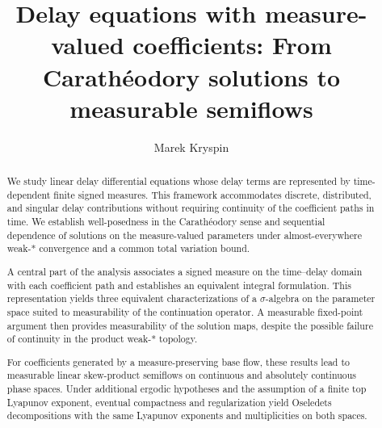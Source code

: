 \documentclass[reqno]{amsart}
\theoremstyle{plain}
\numberwithin{equation}{section}
\numberwithin{definition}{section}
\begin{document}
\title[Delay equations with measure-valued coefficients]{ Delay equations with measure-valued coefficients:
From Carath\'eodory solutions to measurable semiflows }
\author[M.~Kryspin]{Marek Kryspin}
\address[Marek Kryspin]{Faculty of Pure and Applied Mathematics,
Wroc{\l}aw University of Science and Technology,
Wybrze\.ze Wyspia\'nskiego 27, PL-50-370 Wroc{\l}aw, Poland.}
\begin{abstract}
 We study linear delay differential equations whose delay
terms are represented by time-dependent finite signed
measures. This framework accommodates discrete,
distributed, and singular delay contributions without
requiring continuity of the coefficient paths in time.
We establish well-posedness in the Carath\'eodory sense
and sequential dependence of solutions on the
measure-valued parameters under almost-everywhere
weak-* convergence and a common total variation bound.

A central part of the analysis associates a signed
measure on the time--delay domain with each coefficient
path and establishes an equivalent integral formulation.
This representation yields three equivalent
characterizations of a $\sigma$-algebra on the parameter
space suited to measurability of the continuation
operator. A measurable fixed-point argument then
provides measurability of the solution maps, despite
the possible failure of continuity in the product
weak-* topology.

For coefficients generated by a measure-preserving
base flow, these results lead to measurable linear
skew-product semiflows on continuous and absolutely
continuous phase spaces. Under additional ergodic
hypotheses and the assumption of a finite top
Lyapunov exponent, eventual compactness and
regularization yield Oseledets decompositions with
the same Lyapunov exponents and multiplicities
on both spaces.
\end{abstract}
\maketitle

\end{document}
